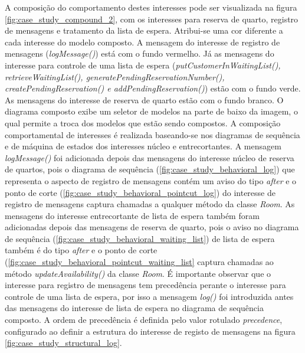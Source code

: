 A composição do comportamento destes interesses pode ser visualizada na figura \ref{fig:case_study_compound_2}, com os interesses
para reserva de quarto, registro de mensagens e tratamento da lista de espera. Atribui-se uma cor diferente a cada interesse do modelo composto. 
A mensagem do interesse de registro de mensagens (\textit{logMessage()}) está com o fundo vermelho. Já as mensagens do interesse para controle de uma
lista de espera (\textit{putCustomerInWaitingList(), retrieveWaitingList(), generatePendingReservationNumber(), createPendingReservation() e addPendingReservation()})
estão com o fundo verde. As mensagens do interesse de reserva de quarto estão com o fundo branco. O diagrama composto exibe um seletor de modelos na
parte de baixo da imagem, o qual permite a troca dos modelos que estão sendo compostos. A composição comportamental de interesses é realizada
baseando-se nos diagramas de sequência e de máquina de estados dos interesses núcleo e entrecortantes. A mensagem \textit{logMessage()} foi adicionada
depois das mensagens do interesse núcleo de reserva de quartos, pois o diagrama de sequência (\ref{fig:case_study_behavioral_log}) que representa o aspecto de
registro de mensagens contém um aviso do tipo \textit{after} e o ponto de corte (\ref{fig:case_study_behavioral_pointcut_log}) do interesse de registro de mensagens 
captura chamadas a qualquer método da classe \textit{Room}. As mensagens do interesse entrecortante de lista de espera também foram adicionadas depois
das mensagens de reserva de quarto, pois o aviso no diagrama de sequência (\ref{fig:case_study_behavioral_waiting_list}) de lista de espera também é 
do tipo \textit{after} e o ponto de corte (\ref{fig:case_study_behavioral_pointcut_waiting_list} captura chamadas ao método \textit{updateAvailability()} da 
classe \textit{Room}. É importante observar que o interesse para registro de mensagens tem precedência perante o interesse para controle de uma lista
de espera, por isso a mensagem \textit{log()} foi introduzida antes das mensagens do interesse de lista de espera no diagrama de sequência composto. 
A ordem de precedência é definida pelo valor rotulado \textit{precedence}, configurado ao definir a estrutura do interesse de registo de mensagens na figura
\ref{fig:case_study_structural_log}.

